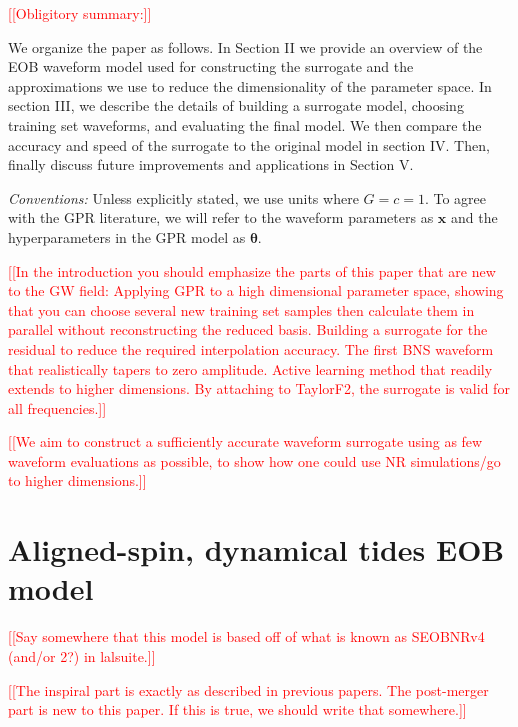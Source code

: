 \documentclass[prd,aps,letter,twocolumn,floatfix,notitlepage,nofootinbib]{revtex4-1}
\def\bx{\mathbf{x}}
\def\btheta{\boldsymbol{\theta}}
\newcommand{\red}[1]{\textcolor{red}{#1}}
\begin{document}
\red{[[Obligitory summary:]]}

We organize the paper as follows. In Section II we provide an overview of the EOB waveform model used for constructing the surrogate and the approximations we use to reduce the dimensionality of the parameter space. In section III, we describe the details of building a surrogate model, choosing training set waveforms, and evaluating the final model. We then compare the accuracy and speed of the surrogate to the original model in section IV. Then, finally discuss future improvements and applications in Section V.

\textit{Conventions:} Unless explicitly stated, we use units where $G=c=1$. To agree with the GPR literature, we will refer to the waveform parameters as $\bx$ and the hyperparameters in the GPR model as $\btheta$.

\red{[[In the introduction you should emphasize the parts of this paper that are new to the GW field: Applying GPR to a high dimensional parameter space, showing that you can choose several new training set samples then calculate them in parallel without reconstructing the reduced basis. Building a surrogate for the residual to reduce the required interpolation accuracy. The first BNS waveform that realistically tapers to zero amplitude. Active learning method that readily extends to higher dimensions. By attaching to TaylorF2, the surrogate is valid for all frequencies.]]}

\red{[[We aim to construct a sufficiently accurate waveform surrogate using as few waveform evaluations as possible, to show how one could use NR simulations/go to higher dimensions.]]}


\section{Aligned-spin, dynamical tides EOB model}

\red{[[Say somewhere that this model is based off of what is known as SEOBNRv4 (and/or 2?) in lalsuite.]]}

\red{[[The inspiral part is exactly as described in previous papers. The post-merger part is new to this paper. If this is true, we should write that somewhere.]]}
\end{document}
